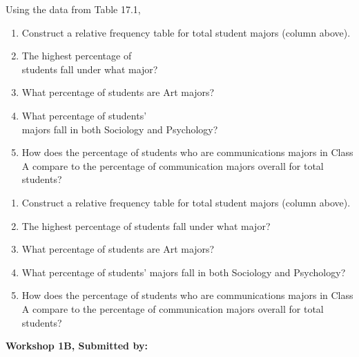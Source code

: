 \documentclass[11pt, chapterprefix=true]{scrbook}\usepackage[]{graphicx}\usepackage[]{color}
\begin{document}
\begin{exercises}
\begin{exercise}
\begin{minipage}[ht]{6cm}
    Using the data from Table 17.1,

\begin{enumerate}
  \item Construct a relative frequency table for total student majors (column above).
  \item	The highest percentage of \\ students fall under what major?
  \item	What percentage of students are Art majors?
  \item	What percentage of students' \\ majors fall in both Sociology and Psychology?
  \item	How does the percentage of students who are communications majors in Class A compare to the percentage of communication majors overall for total students? 
\end{enumerate}
\end{minipage}
    \end{exercise}
    \begin{solution}
      
  \begin{enumerate}
  \item Construct a relative frequency table for total student majors (column above).
  \item	The highest percentage of students fall under what major?
  \item	What percentage of students are Art majors?
  \item	What percentage of students’ majors fall in both Sociology and Psychology?
  \item	How does the percentage of students who are communications majors in Class A compare to the percentage of communication majors overall for total students? 
\end{enumerate}  
    \end{solution}
  
\clearpage

    \begin{exercise}  %
    
    \begin{center}
\begin{flushleft}\textbf{ \large \hfill Workshop 1B, Submitted by: }\end{flushleft}

\end{center}
\end{exercise}
\end{exercises}
\end{document}
